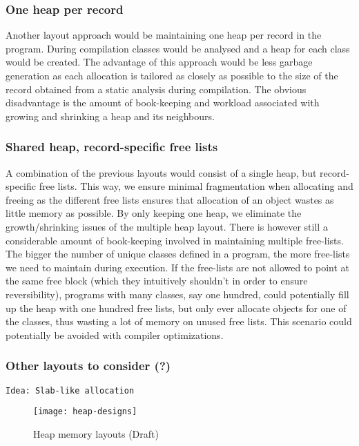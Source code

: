 \subsubsection{One heap per record}
Another layout approach would be maintaining one heap per record in the program. During compilation classes would be analysed and a heap for each class would be created. The advantage of this approach would be less garbage generation as each allocation is tailored as closely as possible to the size of the record obtained from a static analysis during compilation. The obvious disadvantage is the amount of book-keeping and workload associated with growing and shrinking a heap and its neighbours.

\subsubsection{Shared heap, record-specific free lists}
A combination of the previous layouts would consist of a single heap, but record-specific free lists. This way, we ensure minimal fragmentation when allocating and freeing as the different free lists ensures that allocation of an object wastes as little memory as possible. By only keeping one heap, we eliminate the growth/shrinking issues of the multiple heap layout. There is however still a considerable amount of book-keeping involved in maintaining multiple free-lists. The bigger the number of unique classes defined in a program, the more free-lists we need to maintain during execution. If the free-lists are not allowed to point at the same free block (which they intuitively shouldn't in order to ensure reversibility), programs with many classes, say one hundred, could potentially fill up the heap with one hundred free lists, but only ever allocate objects for one of the classes, thus wasting a lot of memory on unused free lists. This scenario could potentially be avoided with compiler optimizations.\\

\subsubsection{Other layouts to consider (?)}
\texttt{Idea: Slab-like allocation}

\begin{figure}
  \centering
  \texttt{[image: heap-designs]}
  \caption{Heap memory layouts (Draft)}
\end{figure}
